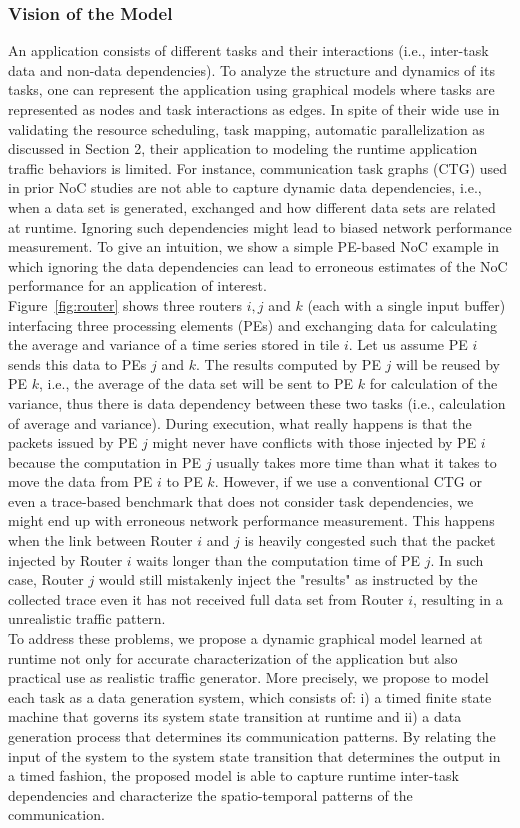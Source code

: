 \subsubsection{Vision of the Model}
An application consists of different tasks and their interactions (i.e., inter-task data and non-data dependencies). To analyze the structure and dynamics of its tasks, one can represent the application using graphical models where tasks are represented as nodes and task interactions as edges. In spite of their wide use in validating the resource scheduling, task mapping, automatic parallelization as discussed in Section 2, their application to modeling the runtime application traffic behaviors is limited. For instance, communication task graphs (CTG) used in prior NoC studies are not able to capture dynamic data dependencies, i.e., when a data set is generated,  exchanged and how different data sets are related at runtime. Ignoring such dependencies might lead to biased network performance measurement. To give an intuition, we show a simple PE-based NoC example in which ignoring the data dependencies can lead to erroneous estimates of the NoC performance for an application of interest. \\
\indent Figure~\ref{fig:router} shows three routers $i, j$ and $k$ (each with a single input buffer) interfacing three processing elements (PEs) and exchanging data for calculating the average and variance of a time series stored in tile $i$. Let us assume PE $i$ sends this data to PEs $j$ and $k$. The results computed by PE $j$ will be reused by PE $k$, i.e., the average of the data set will be sent to PE $k$ for calculation of the variance, thus there is data dependency between these two tasks (i.e., calculation of average and variance). During execution, what really happens is that the packets issued by PE $j$ might never have conflicts with those injected by PE $i$ because the computation in PE $j$ usually takes more time than what it takes to move the data from PE $i$ to PE $k$. However, if we use a conventional CTG or even a trace-based benchmark that does not consider task dependencies, we might end up with erroneous network performance measurement. This happens when the link between Router $i$ and $j$ is heavily congested such that the packet injected by Router $i$ waits longer than the computation time of PE $j$. In such case, Router $j$ would still mistakenly inject the "results" as instructed by the collected trace even it has not received full data set from Router $i$, resulting in a unrealistic traffic pattern.\\
\indent To address these problems, we propose a dynamic graphical model learned at runtime not only for accurate characterization of the application but also practical use as realistic traffic generator. More precisely, we propose to model each task as a data generation system, which consists of: i) a timed finite state machine that governs its system state transition at runtime and ii) a data generation process that determines its communication patterns. By relating the input of the system to the system state transition that determines the output in a timed fashion, the proposed model is able to capture runtime inter-task dependencies and characterize the spatio-temporal patterns of the communication.
